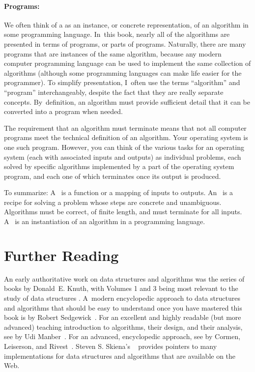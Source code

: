 \paragraph{Programs:}

We often think of a  as an
instance, or concrete representation, of an algorithm in some
programming language.
In~this book, nearly all of the algorithms are presented in terms of
programs, or parts of programs.
Naturally, there are many programs that are instances of the same
algorithm, because any modern computer programming language can be
used to implement the same collection of algorithms (although some
programming languages can make life easier for the programmer).
To simplify presentation,
I~often use the terms ``algorithm'' and ``program'' interchangeably,
despite the fact that they are really separate concepts.
By~definition, an algorithm must provide sufficient
detail that it can be converted into a program when needed.

The requirement that an algorithm must terminate means that not all
computer programs meet the technical definition of an algorithm.
Your operating system is one such program.
However, you can think of the various tasks for an operating system
(each with associated inputs and outputs) as individual problems,
each solved by specific algorithms implemented by a part of the
operating system program, and each one of which terminates once its
output is produced.

To summarize:
A~ is a function or a mapping of
inputs to outputs.
An~ is a recipe for
solving a problem whose steps are concrete and unambiguous.
Algorithms must be correct, of finite length, and must terminate
for all inputs.
A~ is an instantiation of an algorithm
in a programming language.

\section{Further Reading}

An early authoritative work on data structures and algorithms was
the series of books 
by Donald~E. Knuth, with Volumes 1 and 3 being most relevant to the
study of data structures \cite{KnuthV1,KnuthV3}.
A~modern encyclopedic approach to data structures and algorithms that
should be easy to understand once you have mastered this book is
 by Rob\-ert Sedge\-wick~\cite{Sedgewick}.
For an excellent and highly readable (but more advanced) teaching
introduction to algorithms, their design, and their analysis, see
by Udi Manber~\cite{Manber}.
For an advanced, encyclopedic approach, see
 by Cormen, Leiserson, and
Rivest~\cite{CLR}.
Steven S. Skiena's ~\cite{Skiena}
provides pointers to many implementations for data structures and
algorithms that are available on the Web.

